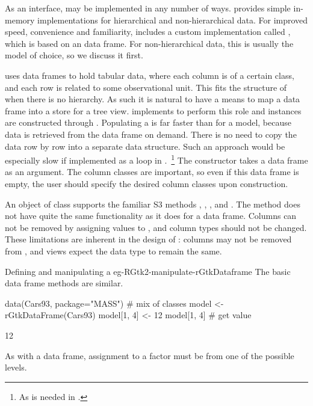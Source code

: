 As an interface,  may be implemented in any number
of ways. \GTK\/ provides simple in-memory implementations for
hierarchical and non-hierarchical data. For improved speed,
convenience and familiarity,  includes a custom
 implementation called , which
is based on an \R\/ data frame. For non-hierarchical data, this is
usually the model of choice, so we discuss it first.

\R\/ uses data frames to hold tabular data, where each column is of a
certain class, and each row is related to some observational
unit. This fits the structure of  when there is no
hierarchy. As such it is natural to have a means to map a data frame
into a store for a tree view.  implements
 to perform this role and instances are
constructed through . Populating a
 is far faster than for a \GTK\/ model, because
data is retrieved from the data frame on demand. There is no need to
copy the data row by row into a separate data structure. Such an
approach would be especially slow if implemented as a loop in
\R.~\footnote{As is needed in .} The constructor takes a
data frame as an argument. The column classes are important, so even
if this data frame is empty, the user should specify the desired
column classes upon construction.

An object of class  supports the familiar S3
methods \method{[}{RGtkDataFrame}, \method{[\ASSIGN}{RGtkDataFrame},
, and
. The \code{[$<$-} method does
not have quite the same functionality as it does for a data
frame. Columns can not be removed by assigning values to ,
and column types should not be changed. These limitations are inherent
in the design of \GTK: columns may not be removed from
, and views expect the data type to remain the
same.

\begin{example}{Defining and manipulating a }{eg-RGtk2-manipulate-rGtkDataframe}
  The basic data frame methods are similar.
\begin{Schunk}
\begin{Sinput}
 data(Cars93, package="MASS")             # mix of classes
 model <- rGtkDataFrame(Cars93)
 model[1, 4] <- 12
 model[1, 4]                              # get value
\end{Sinput}
\begin{Soutput}
[1] 12
\end{Soutput}
\end{Schunk}
%
As with a data frame, assignment to a factor must be from one of the
possible levels.

\end{example}

